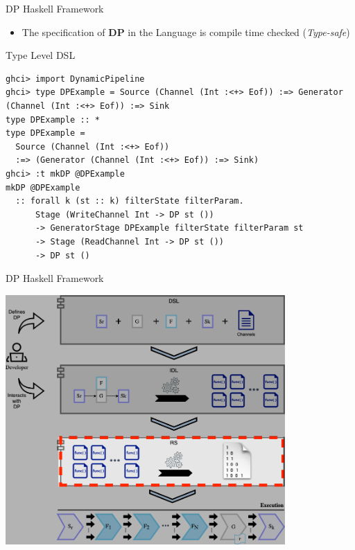 \documentclass{beamer}
\begin{document}
  \begin{frame}[fragile]{DP Haskell Framework}
    \begin{itemize}
      \item The specification of \textbf{DP} in the Language is compile time checked (\textit{Type-safe})
    \end{itemize}    
    \begin{exampleblock}{Type Level DSL}
      \begin{verbatim}      
ghci> import DynamicPipeline
ghci> type DPExample = Source (Channel (Int :<+> Eof)) :=> Generator (Channel (Int :<+> Eof)) :=> Sink
type DPExample :: *
type DPExample =
  Source (Channel (Int :<+> Eof))
  :=> (Generator (Channel (Int :<+> Eof)) :=> Sink)
ghci> :t mkDP @DPExample
mkDP @DPExample
  :: forall k (st :: k) filterState filterParam.
      Stage (WriteChannel Int -> DP st ())
      -> GeneratorStage DPExample filterState filterParam st
      -> Stage (ReadChannel Int -> DP st ())
      -> DP st ()    
    \end{verbatim}
    \end{exampleblock}
  \end{frame}

  \begin{frame}[fragile]{DP Haskell Framework}
    \begin{center}
      \includegraphics[width = 0.8\textwidth, height = 0.8\textheight]{dpf_haskell_v3-3}
    \end{center}
  \end{frame}
\end{document}
